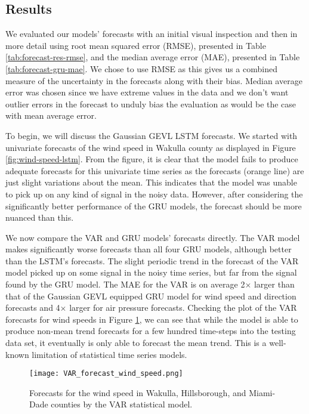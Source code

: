 \documentclass[conference]{IEEEtran}
\begin{document}


\subsection{Results}

We evaluated our models' forecasts with an initial visual inspection and then in more detail using root mean squared error (RMSE), presented in Table \ref{tab:forecast-res-rmse}, and the median average error (MAE), presented in Table \ref{tab:forecast-gru-mae}. We chose to use RMSE as this gives us a combined measure of the uncertainty in the forecasts along with their bias. Median average error was chosen since we have extreme values in the data and we don't want outlier errors in the forecast to unduly bias the evaluation as would be the case with mean average error. 

To begin, we will discuss the Gaussian GEVL LSTM forecasts. We started with univariate forecasts of the wind speed in Wakulla county as displayed in Figure \ref{fig:wind-speed-lstm}. From the figure, it is clear that the model fails to produce adequate forecasts for this univariate time series as the forecasts (orange line) are just slight variations about the mean. This indicates that the model was unable to pick up on any kind of signal in the noisy data. However, after considering the significantly better performance of the GRU models, the forecast should be more nuanced than this.

We now compare the VAR and GRU models' forecasts directly. The VAR model makes significantly worse forecasts than all four GRU models, although better than the LSTM's forecasts. The slight periodic trend in the forecast of the VAR model picked up on some signal in the noisy time series, but far from the signal found by the GRU model. The MAE for the VAR is on average 2$\times$ larger than that of the Gaussian GEVL equipped GRU model for wind speed and direction forecasts and 4$\times$ larger for air pressure forecasts. Checking the plot of the VAR forecasts for wind speeds in Figure \ref{fig:var-ws-forecasts}, we can see that while the model is able to produce non-mean trend forecasts for a few hundred time-steps into the testing data set, it eventually is only able to forecast the mean trend. This is a well-known limitation of statistical time series models.

\begin{figure}
    \centering
    \texttt{[image: VAR\_forecast\_wind\_speed.png]}
    \caption{Forecasts for the wind speed in Wakulla, Hillsborough, and Miami-Dade counties by the VAR statistical model.}
    \label{fig:var-ws-forecasts}
\end{figure}
\end{document}
